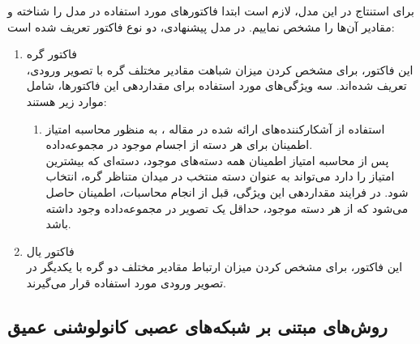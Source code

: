 برای استنتاج در این مدل، لازم است ابتدا فاکتور‌های مورد استفاده در مدل را شناخته و مقادیر آن‌ها را مشخص نماییم. در مدل پیشنهادی، دو نوع فاکتور تعریف شده است:

\begin{enumerate}
\item فاکتور گره\\
این فاکتور، برای مشخص کردن میزان شباهت مقادیر مختلف گره با تصویر ورودی، تعریف شده‌اند. سه ویژگی‌‌های مورد استفاده برای مقداردهی این فاکتورها، شامل موارد زیر هستند:
\begin{enumerate}
	\item استفاده از آشکارکننده‌های ارائه شده در مقاله \cite{felzenszwalb2008discriminatively}، 
	به منظور محاسبه امتیاز اطمینان برای هر دسته از اجسام موجود در مجموعه‌داده.\\
	پس از محاسبه امتیاز اطمینان همه دسته‌های موجود، دسته‌ای که بیشترین امتیاز را دارد می‌تواند به عنوان دسته‌ منتخب در میدان متناظر گره، انتخاب شود. در فرایند مقداردهی این ویژگی، قبل از انجام محاسبات، اطمینان حاصل می‌شود که از هر دسته موجود، حداقل یک تصویر در مجموعه‌داده وجود داشته باشد.
\end{enumerate}

\item فاکتور یال\\
این فاکتور، برای مشخص کردن میزان ارتباط مقادیر مختلف دو گره با یکدیگر در تصویر ورودی مورد استفاده قرار می‌گیرند.
\end{enumerate}




\subsection{روش‌های مبتنی بر شبکه‌های عصبی کانولوشنی عمیق}